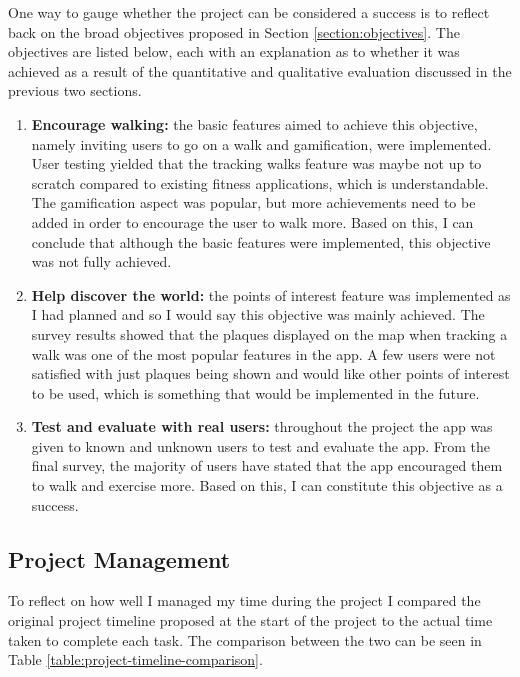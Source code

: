 
One way to gauge whether the project can be considered a success is to reflect back on the broad objectives proposed in Section \ref{section:objectives}. The objectives are listed below, each with an explanation as to whether it was achieved as a result of the quantitative and qualitative evaluation discussed in the previous two sections.

\begin{enumerate}[label=\textbf{Obj \arabic*}]
  \item \textbf{Encourage walking:} the basic features aimed to achieve this objective, namely inviting users to go on a walk and gamification, were implemented. User testing yielded that the tracking walks feature was maybe not up to scratch compared to existing fitness applications, which is understandable. The gamification aspect was popular, but more achievements need to be added in order to encourage the user to walk more. Based on this, I can conclude that although the basic features were implemented, this objective was not fully achieved.

  \item \textbf{Help discover the world:} the points of interest feature was implemented as I had planned and so I would say this objective was mainly achieved. The survey results showed that the plaques displayed on the map when tracking a walk was one of the most popular features in the app. A few users were not satisfied with just plaques being shown and would like other points of interest to be used, which is something that would be implemented in the future.

  \item \textbf{Test and evaluate with real users:} throughout the project the app was given to known and unknown users to test and evaluate the app. From the final survey, the majority of users have stated that the app encouraged them to walk and exercise more. Based on this, I can constitute this objective as a success.
\end{enumerate}

\subsection{Project Management}

To reflect on how well I managed my time during the project I compared the original project timeline proposed at the start of the project to the actual time taken to complete each task. The comparison between the two can be seen in Table \ref{table:project-timeline-comparison}.

